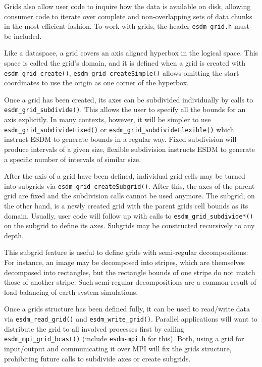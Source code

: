Grids also allow user code to inquire how the data is available on disk, allowing consumer code to iterate over complete and non-overlapping sets of data chunks in the most efficient fashion.
To work with grids, the header \lstinline|esdm-grid.h| must be included.

Like a dataspace, a grid covers an axis aligned hyperbox in the logical space. 
This space is called the grid's domain, and it is defined when a grid is created with \lstinline|esdm_grid_create()|, \lstinline|esdm_grid_createSimple()| allows omitting the start coordinates to use the origin as one corner of the hyperbox.

Once a grid has been created, its axes can be subdivided individually by calls to \lstinline|esdm_grid_subdivide()|. 
This allows the user to specify all the bounds for an axis explicitly. 
In many contexts, however, it will be simpler to use \lstinline|esdm_grid_subdivideFixed()| or \lstinline|esdm_grid_subdivideFlexible()| which instruct ESDM to generate bounds
in a regular way. 
Fixed subdivision will produce intervals of a given size, flexible subdivision instructs ESDM to generate a specific number of intervals of similar size.

After the axis of a grid have been defined, individual grid cells may be turned into subgrids via \lstinline|esdm_grid_createSubgrid()|. 
After this, the axes of the parent grid are fixed and the subdivision calls cannot be used anymore. 
The subgrid, on the other hand, is a newly created grid with the parent grids cell bounds as its domain. 
Usually, user code will follow up with calls to \lstinline|esdm_grid_subdivide*()| on the subgrid to define its axes. 
Subgrids may be constructed recursively to any depth.

This subgrid feature is useful to define grids with semi-regular decompositions: For instance, an image may be decomposed into stripes, which are themselves decomposed into rectangles, but the rectangle bounds of one stripe do not match those of another stripe. 
Such semi-regular decompositions are a common result of load balancing of earth system simulations.

Once a grids structure has been defined fully, it can be used to read/write data via \lstinline|esdm_read_grid()| and \lstinline|esdm_write_grid()|.
Parallel applications will want to distribute the grid to all involved processes first by calling \lstinline|esdm_mpi_grid_bcast()| (include \lstinline|esdm-mpi.h| for this). 
Both, using a grid for input/output and communicating it over MPI will fix the grids structure, prohibiting future calls to subdivide axes or create subgrids.

